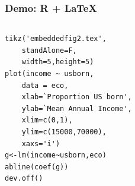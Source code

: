 \begin{frame}[fragile]
    \frametitle{Demo: R + \LaTeX}
    \begin{columns}
        \begin{column}{0.45\textwidth}
            \begin{lstlisting}
tikz('embeddedfig2.tex', 
    standAlone=F, 
    width=5,height=5)
plot(income ~ usborn, 
    data = eco,
    xlab=`Proportion US born',
    ylab=`Mean Annual Income',
    xlim=c(0,1),
    ylim=c(15000,70000),
    xaxs='i')
g<-lm(income~usborn,eco)
abline(coef(g))
dev.off()
            \end{lstlisting}
        \end{column}
        \begin{column}{0.55\textwidth}
            
        \end{column}
    \end{columns} 
\end{frame}

